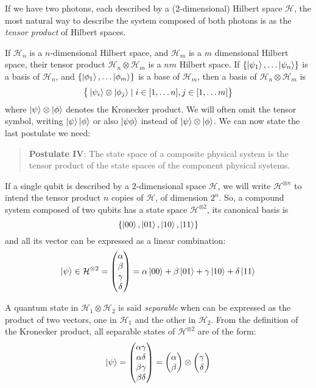\documentclass[10pt,a4paper, titlepage]{report}
\theoremstyle{definition}
\newcommand{\kp}{\ket{\psi}}
\newcommand{\kf}{\ket{\phi}}
\newcommand{\calH}{\mathcal{H}}
\newcommand{\Hto}[1]{\mathcal{H}^{\otimes #1}}
\newcommand{\tensor}{\otimes}
\begin{document}
If we have two photons, each described by a (2-dimensional) Hilbert space $\calH$, the most natural way to describe the system composed of both photons is as the \textit{tensor product} of Hilbert spaces.	

If $\calH_n$ is a $n$-dimensional Hilbert space, and $\calH_m$ is a $m$ dimensional Hilbert space, their tensor product $\calH_n \tensor \calH_m$ is a $nm$ Hilbert space. If $\{\ket{\psi_1}, \ldots \ket{\psi_n}\}$ is a basis of $\calH_n$, and $\{\ket{\phi_1}, \ldots\ket{\phi_m}\}$ is a base of $\calH_m$, then a basis of $\calH_n \tensor \calH_m$ is\[\big\{\ket{\psi_i}\tensor\ket{\phi_j} \mid i \in [1, \ldots n], j \in [1, \ldots m] \big\}\]
 where $\kp \tensor \kf$ denotes the Kronecker product. We will often omit the tensor symbol, writing $\ket{\psi}\ket{\phi}$ or also $\ket{\psi\phi}$ instead of $\kp\tensor\kf$. We can now state the last postulate we need:

\begin{quote}
\textbf{Postulate IV}: The state space of a composite physical system is the tensor product of the state spaces of the component physical systems. 
\end{quote}

If a single qubit is described by a $2$-dimensional space $\calH$, we will write $\calH^{\tensor n}$ to intend the tensor product $n$ copies of $\calH$, of dimension $2^n$. So, a compound system composed of two qubits has a state space $\calH^{\tensor 2}$, its canonical basis is 
\[\{\ket{00}, \ket{01}, \ket{10}, \ket{11}\}\]
and all its vector can be expressed as a linear combination:
\[\kp \in \Hto{2} = \begin{pmatrix}
\alpha \\ \beta \\ \gamma \\ \delta
\end{pmatrix} = \alpha\ket{00} + \beta\ket{01} + \gamma\ket{10} + \delta\ket{11}\]

A quantum state in $\calH_1 \tensor \calH_2$ is said \textit{separable} when can be expressed as the product of two vectors, one in $\calH_1$ and the other in $\calH_2$. From the definition of the Kronecker product, all separable states of $\Hto{2}$ are of the form:
\[
 \kp = \begin{pmatrix}
 \alpha\gamma \\ \alpha\delta \\ \beta\gamma \\ \beta\delta
 \end{pmatrix} = 
 \begin{pmatrix}
 \alpha \\ \beta
 \end{pmatrix} \tensor 
 \begin{pmatrix}
 \gamma \\ \delta
 \end{pmatrix}
\]
\end{document}

